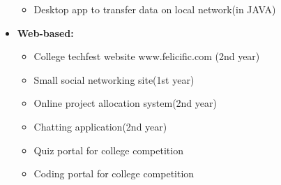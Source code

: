 \documentclass[12pt,a4paper,english]{article}
\begin{document}
\begin{flushleft}
\begin{itemize}
\begin{itemize}
				\item Desktop app to transfer data on local network(in JAVA)
			\end{itemize}
			\item	\textbf{Web-based:}\\
			\begin{itemize}
				\item College techfest website www.felicific.com (2nd year)
				\item Small social networking site(1st year)
				\item Online project allocation system(2nd year)
				\item Chatting application(2nd year)
				\item Quiz portal for college competition
				\item Coding portal for college competition
			\end{itemize}
		\end{itemize}
		\vspace{0.3in}
	\end{flushleft}
\end{document}
